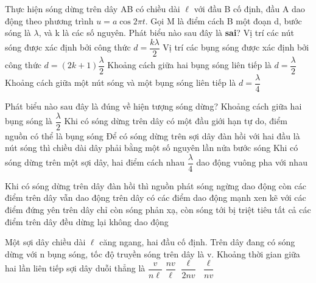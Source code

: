 \begin{ex}%
Thực hiện sóng dừng trên dây AB có chiều dài $\ell$ với đầu B cố định, đầu A dao động theo phương trình $u=a\cos2\pi t$. Gọi M là điểm cách B một đoạn d, bước sóng là $\lambda$, và k là các số nguyên. Phát biểu nào sau đây là \textbf{sai}?
\choice
{Vị trí các nút sóng được xác định bởi công thức $d=\dfrac{k\lambda}{2}$}
{\True Vị trí các bụng sóng được xác định bởi công thức $d=(2k + 1)\dfrac{\lambda}{2}$}
{Khoảng cách giữa hai bụng sóng liên tiếp là $d=\dfrac{\lambda}{2}$}
{Khoảng cách giữa một nút sóng và một bụng sóng liên tiếp là $d=\dfrac{\lambda}{4}$}
\end{ex} 
\begin{ex}%
Phát biểu nào sau đây là đúng về hiện tượng sóng dừng? 
\choice
{Khoảng cách giữa hai bụng sóng là $\dfrac{\lambda}{2}$}
{Khi có sóng dừng trên dây có một đầu giới hạn tự do, điểm nguồn có thể là bụng sóng}
{\True Để có sóng dừng trên sợi dây đàn hồi với hai đầu là nút sóng thì chiều dài dây phải bằng một số nguyên lần nửa bước sóng}
{Khi có sóng dừng trên một sợi dây, hai điểm cách nhau $\dfrac{\lambda}{4}$ dao động vuông pha với nhau}
\end{ex} 
\begin{ex}%
Khi có sóng dừng trên dây đàn hồi thì
\choice
{nguồn phát sóng ngừng dao động còn các điểm trên dây vẫn dao động}
{\True trên dây có các điểm dao động mạnh xen kẽ với các điểm đứng yên}
{trên dây chỉ còn sóng phản xạ, còn sóng tới bị triệt tiêu}
{tất cả các điểm trên dây đều dừng lại không dao động}
\end{ex} 
\begin{ex}%
Một sợi dây chiều dài $\ell$ căng ngang, hai đầu cố định. Trên dây đang có sóng dừng với n bụng sóng, tốc độ truyền sóng trên dây là v. Khoảng thời gian giữa hai lần liên tiếp sợi dây duỗi thẳng là
\choice
{$\dfrac{v}{n\ell }$}
{$\dfrac{nv}{\ell }$}
{$\dfrac{\ell }{2nv}$}
{\True $\dfrac{\ell }{nv}$}
\end{ex} 
 
